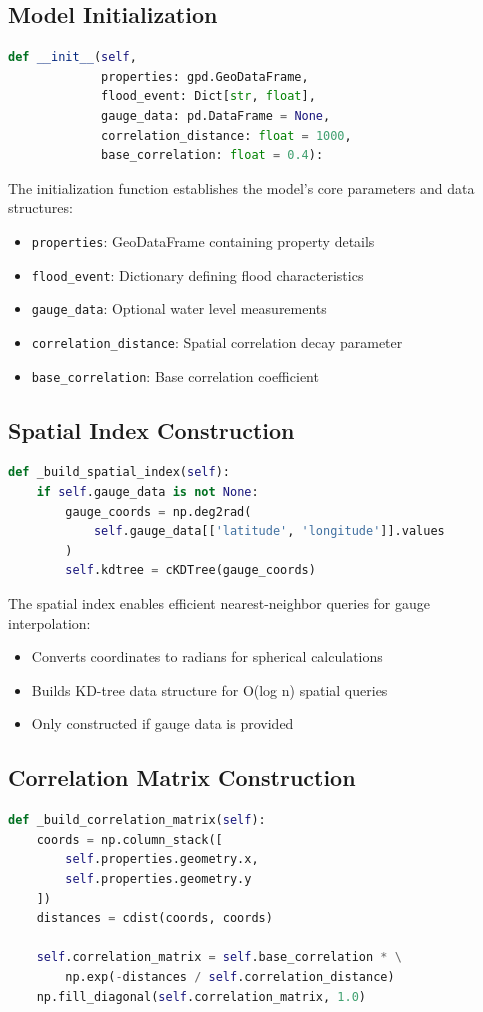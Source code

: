 \documentclass{article}
\begin{document}
\subsection{Model Initialization}
\begin{lstlisting}[language=Python]
def __init__(self, 
             properties: gpd.GeoDataFrame,
             flood_event: Dict[str, float],
             gauge_data: pd.DataFrame = None,
             correlation_distance: float = 1000,
             base_correlation: float = 0.4):
\end{lstlisting}

The initialization function establishes the model's core parameters and data structures:
\begin{itemize}
    \item \texttt{properties}: GeoDataFrame containing property details
    \item \texttt{flood\_event}: Dictionary defining flood characteristics
    \item \texttt{gauge\_data}: Optional water level measurements
    \item \texttt{correlation\_distance}: Spatial correlation decay parameter
    \item \texttt{base\_correlation}: Base correlation coefficient
\end{itemize}

\subsection{Spatial Index Construction}
\begin{lstlisting}[language=Python]
def _build_spatial_index(self):
    if self.gauge_data is not None:
        gauge_coords = np.deg2rad(
            self.gauge_data[['latitude', 'longitude']].values
        )
        self.kdtree = cKDTree(gauge_coords)
\end{lstlisting}

The spatial index enables efficient nearest-neighbor queries for gauge interpolation:
\begin{itemize}
    \item Converts coordinates to radians for spherical calculations
    \item Builds KD-tree data structure for O(log n) spatial queries
    \item Only constructed if gauge data is provided
\end{itemize}

\subsection{Correlation Matrix Construction}
\begin{lstlisting}[language=Python]
def _build_correlation_matrix(self):
    coords = np.column_stack([
        self.properties.geometry.x,
        self.properties.geometry.y
    ])
    distances = cdist(coords, coords)
    
    self.correlation_matrix = self.base_correlation * \
        np.exp(-distances / self.correlation_distance)
    np.fill_diagonal(self.correlation_matrix, 1.0)
\end{lstlisting}
\end{document}
